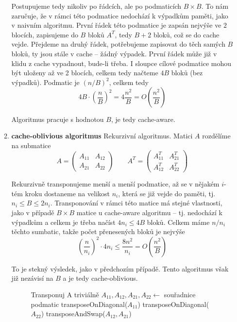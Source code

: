 \documentclass[11pt]{report} %
\numberwithin{equation}{section}
\begin{document}
\begin{itemize}
\begin{enumerate}
			Postupujeme tedy nikoliv po řádcích, ale po podmaticích $B \times B$. To nám zaručuje, že v rámci této podmatice nedochází k výpadkům paměti, jako v naivním algoritmu. První řádek této podmatice je zapsán nejvýše ve $2$ blocích, zapisujeme do $B$ bloků $A^T$, tedy $B+2$ bloků, což se do cache vejde. Přejdeme na druhý řádek, potřebujeme zapisovat do těch samých $B$ bloků, ty jsou stále v cache -- žádný výpadek. První řádek může již v klidu z cache vypadnout, bude-li třeba. I sloupce cílové podmatice mohou být uloženy až ve 2 blocích, celkem tedy načteme $4B$ bloků (bez výpadků). Podmatic je $(n/B)^2$, celkem tedy $$4B \cdot \left(\frac{n}{B}\right)^2 = 4\frac{n^2}{B} = O\left(\frac{n^2}{B}\right)$$
			
			Algoritmus pracuje s hodnotou $B$, je tedy cache-aware.
			
			\item \textbf{cache-oblivious algoritmus} Rekurzivní algoritmus. Matici $A$ rozdělíme na submatice
			$$A = 
			\begin{pmatrix}
			A_{11} & A_{12} \\
			A_{21} & A_{22}
			\end{pmatrix}
			\qquad
			A^T = 
			\begin{pmatrix}
			A_{11}^T & A_{21}^T \\
			A_{12}^T & A_{22}^T
			\end{pmatrix} 
			$$
			
			Rekurzivně transponujeme menší a menší podmatice, až se v nějakém $i$-tém kroku dostaneme na velikost $n_i$, která se již vejde do paměti, tj. $n_i \leq B \leq 2n_i$. Transponování v rámci této matice má stejné vlastnosti, jako v případě $B\times B$ matice u cache-aware algoritmu -- tj. nedochází k výpadkům a celkem je třeba načíst $4n_i \leq 4B$ bloků. Celkem máme $n/n_i$ těchto sumbatic, takže počet přenesených bloků je nejvýše
			$$\left(\frac{n}{n_i} \right)^2 \cdot 4n_i \leq \frac{8n^2}{n_i} = O\left(\frac{n^2}{B}\right)$$
			
			To je stekný výsledek, jako v předchozím případě. Tento algoritmus však již nezávisí na $B$ a je tedy cache-oblivious.
			
			\begin{figure}[h]
				\centering
				\begin{minipage}{.7\linewidth}
					\begin{algorithm}[H]
						\caption{}
						\begin{algorithmic}[1]
								\State Transponuj A triviálně
								\Else
									\State $A_{11}, A_{12}, A_{21}, A_{22} \gets$ souřadnice podmatic
									\State transposeOnDiagonal($A_{11}$)
									\State transposeOnDiagonal($A_{22}$)
									\State transposeAndSwap($A_{12}, A_{21}$)
								\EndIf
							\EndFunction
							

\end{algorithmic}
\end{algorithm}
\end{minipage}
\end{figure}
\end{enumerate}
\end{itemize}
\end{document}
